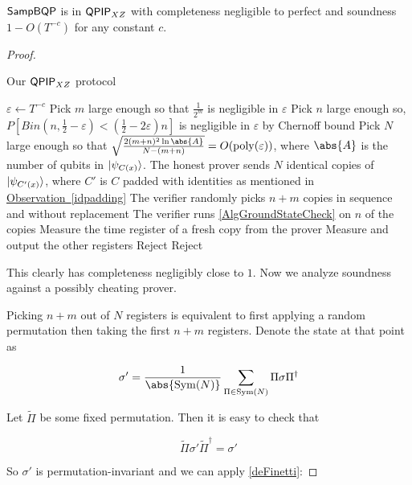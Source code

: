 \begin{theorem}
	$\operatorname{\mathsf{SampBQP}}$ is in $\operatorname{\mathsf{QPIP}}_{XZ}$ with completeness negligible to perfect and soundness $1-O(T^{-c})$ for any constant $c$.
\end{theorem}
\begin{proof}

	\begin{algorithm}
		\caption{Our $\operatorname{\mathsf{QPIP}}_{XZ}$ protocol}
		\label{AlgAmp1}
		\begin{algorithmic}[1]
			\State $\varepsilon\gets T^{-c}$
			\State Pick $m$ large enough so that $\frac{1}{2^m}$ is negligible in $\varepsilon$
			\State Pick $n$ large enough so, $P\left[Bin(n, \frac{1}{2}-\varepsilon)<\left(\frac{1}{2}-2\varepsilon\right)n\right]$ is negligible in $\varepsilon$ by Chernoff bound
			\State Pick $N$ large enough so that $\sqrt{\frac{2(m+n)^2\ln\abs{A}}{N-(m+n)}}=O(\poly(\varepsilon))$, where $\abs{A}$ is the number of qubits in $\ket{\psi_{C(x)}}$.
			\State The honest prover sends $N$ identical copies of $\ket{\psi_{C'(x)}}$, where $C'$ is $C$ padded with identities as mentioned in \hyperref[idpadding]{Observation~\ref*{idpadding}}
			\State The verifier randomly picks $n+m$ copies in sequence and without replacement
			\State The verifier runs \autoref{AlgGroundStateCheck} on $n$ of the copies
				\State Measure the time register of a fresh copy from the prover
					\State Measure and output the other registers
				\EndIf
			\EndFor
			\State Reject
			\Else
			\State Reject
			\EndIf
		\end{algorithmic}
	\end{algorithm}

	This clearly has completeness negligibly close to $1$. Now we analyze soundness against a possibly cheating prover.

	Picking $n+m$ out of $N$ registers is equivalent to first applying a random permutation then taking the first $n+m$ registers. Denote the state at that point as

	$$\sigma'=\frac{1}{\abs{\Sym(N)}}\sum_{\Pi\in\Sym(N)}\Pi\sigma\Pi^\dagger$$

	Let $\tilde{\Pi}$ be some fixed permutation. Then it is easy to check that

	$$\tilde{\Pi}\sigma'\tilde{\Pi}^\dagger=\sigma'$$

	So $\sigma'$ is permutation-invariant and we can apply \autoref{deFinetti}:


\end{proof}

